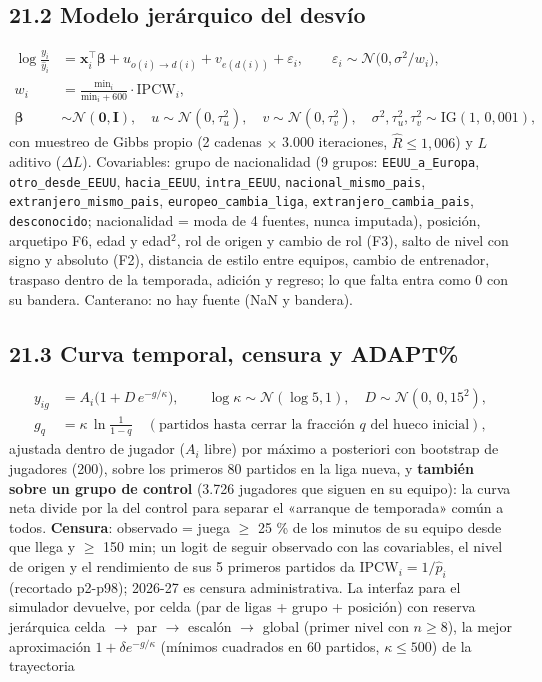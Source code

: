 \documentclass[10pt,a4paper]{article}
\begin{document}
\subsection*{21.2 Modelo jerárquico del desvío}
\[
\begin{aligned} \log\frac{y_i}{\hat y_i} &= \mathbf x_i^{\top}\boldsymbol\beta + u_{o(i)\to d(i)} + v_{e(d(i))} + \varepsilon_i, \qquad \varepsilon_i \sim \mathcal N\!\big(0, \sigma^2/w_i\big),\\ w_i &= \frac{\mathrm{min}_i}{\mathrm{min}_i + 600}\cdot \mathrm{IPCW}_i,\\ \boldsymbol\beta &\sim \mathcal N(\mathbf 0, \mathbf I), \quad u \sim \mathcal N(0, \tau_u^2), \quad v \sim \mathcal N(0, \tau_v^2), \quad \sigma^2, \tau_u^2, \tau_v^2 \sim \mathrm{IG}(1,\, 0{,}001) , \end{aligned}
\]
con muestreo de Gibbs propio (2 cadenas \ensuremath{\times} 3.000 iteraciones, $\hat R \le 1{,}006$) y $L$ aditivo ($\Delta L$). Covariables: grupo de nacionalidad (9 grupos: \texttt{EEUU\_a\_Europa}, \texttt{otro\_desde\_EEUU}, \texttt{hacia\_EEUU}, \texttt{intra\_EEUU}, \texttt{nacional\_mismo\_pais}, \texttt{extranjero\_mismo\_pais}, \texttt{europeo\_cambia\_liga}, \texttt{extranjero\_cambia\_pais}, \texttt{desconocido}; nacionalidad = moda de 4 fuentes, nunca imputada), posición, arquetipo F6, edad y edad\ensuremath{^{2}}, rol de origen y cambio de rol (F3), salto de nivel con signo y absoluto (F2), distancia de estilo entre equipos, cambio de entrenador, traspaso dentro de la temporada, adición y regreso; lo que falta entra como 0 con su bandera. Canterano: no hay fuente (NaN y bandera).

\subsection*{21.3 Curva temporal, censura y ADAPT\%}
\[
\begin{aligned} y_{ig} &= A_i\big(1 + D\,e^{-g/\kappa}\big), \qquad \log\kappa \sim \mathcal N(\log 5, 1), \quad D \sim \mathcal N(0,\, 0{,}15^2),\\ g_{q} &= \kappa\,\ln\frac{1}{1-q}\quad (\text{partidos hasta cerrar la fracción } q \text{ del hueco inicial}) , \end{aligned}
\]
ajustada dentro de jugador ($A_i$ libre) por máximo a posteriori con bootstrap de jugadores (200), sobre los primeros 80 partidos en la liga nueva, y \textbf{también sobre un grupo de control} (3.726 jugadores que siguen en su equipo): la curva neta divide por la del control para separar el «arranque de temporada» común a todos. \textbf{Censura}: observado = juega \ensuremath{\geq} 25 \% de los minutos de su equipo desde que llega y \ensuremath{\geq} 150 min; un logit de seguir observado con las covariables, el nivel de origen y el rendimiento de sus 5 primeros partidos da $\mathrm{IPCW}_i = 1/\hat p_i$ (recortado p2-p98); 2026-27 es censura administrativa. La interfaz para el simulador devuelve, por celda (par de ligas + grupo + posición) con reserva jerárquica celda \ensuremath{\to} par \ensuremath{\to} escalón \ensuremath{\to} global (primer nivel con $n \ge 8$), la mejor aproximación $1 + \delta e^{-g/\kappa}$ (mínimos cuadrados en 60 partidos, $\kappa \le 500$) de la trayectoria
\end{document}

